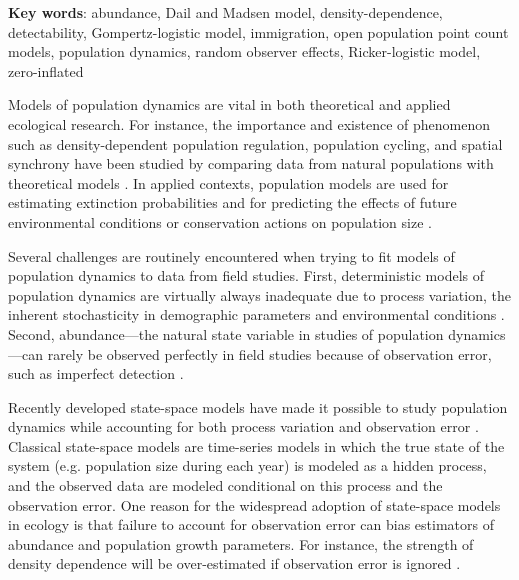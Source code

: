 \documentclass[12pt]{article}
\begin{document}

\textbf{Key words}: abundance, Dail and Madsen model, density-dependence,
detectability, Gompertz-logistic model, immigration, open population point 
count models, population dynamics, random observer effects, Ricker-logistic model, zero-inflated

\vspace{0.5cm}

Models of population dynamics are vital in both theoretical and
applied ecological research. For instance, %
the importance and existence of phenomenon such as
density-dependent population regulation, population cycling, and
spatial synchrony have been studied by comparing data from natural
populations with theoretical models
\citep{may:1975,turchin:1990,bjornstad_etal:1999,royama:1977}. %
In applied contexts, population models are used for estimating extinction probabilities
\citep{schoener_spiller:1992,nadeem_lele:2011,hostetler_etal:2012} and for predicting the
effects of future environmental conditions or conservation actions on
population size \citep{jamieson_brooks:2004,hatfield_etal:2012}.

Several challenges are routinely encountered when trying to fit models
of population dynamics to data from field studies. %
First, deterministic models of population dynamics are virtually always inadequate due to process
variation, the inherent stochasticity in demographic parameters and environmental
conditions \citep{bjornstad_grenfell:2001,saether_engen:2002}.
Second, abundance---the natural state variable in studies
of population dynamics---can rarely be observed perfectly in field
studies because of observation error, such as imperfect
detection \citep{link_nichols:1994,kery_etal:2009}.

Recently developed state-space models %
have made it possible to %
study population dynamics while accounting for both process variation
and observation error \citep{devalpine_hastings:2002,
  buckland_etal:2004, dennis_etal:2006}. Classical state-space
models are time-series models in which the true state of the
system (e.g. population size during each year) is modeled as a hidden
process, and the observed data are modeled conditional on this process
and the observation error. One reason for the widespread adoption of
state-space models in ecology is that failure to account for 
observation error can bias estimators of abundance and
population growth parameters. For instance, the strength of
density dependence will be over-estimated if observation error is
ignored \citep{link_nichols:1994,shenk_etal:1998}.
\end{document}
